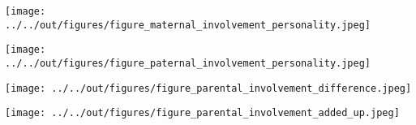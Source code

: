\documentclass[%
    a4paper,            %
    11pt,               %
    bibliography=totoc, %
]
{scrartcl}
\begin{document}




\pagebreak

\clearpage

\centering
\texttt{[image: ../../out/figures/figure\_maternal\_involvement\_personality.jpeg]}

\texttt{[image: ../../out/figures/figure\_paternal\_involvement\_personality.jpeg]}

\texttt{[image: ../../out/figures/figure\_parental\_involvement\_difference.jpeg]}

\texttt{[image: ../../out/figures/figure\_parental\_involvement\_added\_up.jpeg]}

\pagebreak



\pagebreak
\nocite{*}

\singlespacing

\small

\end{document}
